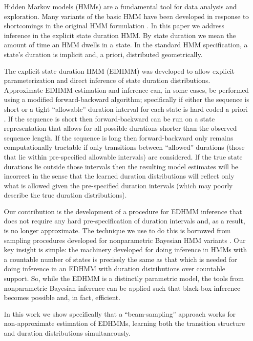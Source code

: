 \label{section}
Hidden Markov models (HMMs) are a fundamental tool for data analysis and exploration.  Many variants of the basic HMM have been developed in response to shortcomings in the original HMM formulation \cite{Rabiner89}.  In this paper we address inference in the explicit state duration HMM.  By state duration we mean the amount of time an HMM dwells in a state.  In the standard HMM specification, a state's duration is implicit and, a priori, distributed geometrically.

The explicit state duration HMM (EDHMM) \cite{Rabiner89} was developed to allow explicit parameterization and direct inference of state duration distributions.  Approximate EDHMM estimation and inference can, in some cases, be performed using a modified forward-backward algorithm; specifically if either the sequence is short or a tight ``allowable'' duration interval for each state is hard-coded a priori \cite{Yu2006}.   If the sequence is short then forward-backward can be run on a state representation that allows for all possible durations shorter than the observed sequence length.  If the sequence is long then forward-backward only remains computationally tractable if only transitions between ``allowed'' durations (those that lie within pre-specified allowable intervals) are considered.   If the true state durations lie outside those intervals then the resulting model estimates will be incorrect in the sense that the learned duration distributions will reflect only what is allowed given the pre-specified duration intervals (which may poorly describe the true duration distributions).

Our contribution is the development of a procedure for EDHMM inference that does not require any hard pre-specification of duration intervals and, as a result, is no longer approximate.  The technique we use to do this 
is borrowed from sampling procedures developed for nonparametric  Bayesian HMM variants \cite{vanGael2008}.  Our key insight is simple: the machinery developed for doing inference in HMMs with a countable number of states is precisely the same as that which is needed for doing inference in an EDHMM with duration distributions over countable support.  So, while the EDHMM is a distinctly parametric model, the tools from nonparametric Bayesian inference can be applied such that black-box inference becomes possible and, in fact, efficient.

In this work we show specifically that a ``beam-sampling'' approach  \cite{vanGael2008} works for non-approximate estimation of EDHMMs, learning both the transition structure and duration distributions simultaneously.


